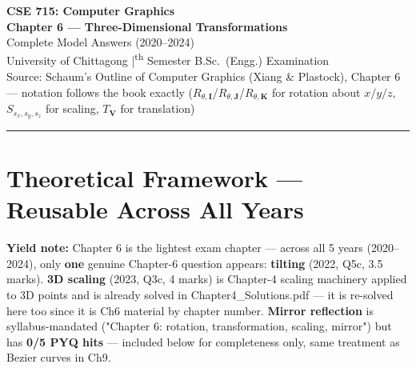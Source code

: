 \documentclass[12pt, a4paper]{article}
\newenvironment{notesbox}{\begin{mdframed}[style=notesframe]}{\end{mdframed}}
\begin{document}

\begin{center}
  {\LARGE\bfseries\color{sectionblue} CSE 715: Computer Graphics}\\[0.6em]
  {\Large\bfseries Chapter 6 --- Three-Dimensional Transformations}\\[0.3em]
  {\large Complete Model Answers (2020--2024)}\\[0.2em]
  {\normalsize University of Chittagong \quad|\textsuperscript{th} Semester B.Sc.\ (Engg.) Examination}\\[0.3em]
  {\small Source: Schaum's Outline of Computer Graphics (Xiang \& Plastock), Chapter 6 --- notation follows the book exactly ($R_{\theta,\mathbf{I}}$/$R_{\theta,\mathbf{J}}$/$R_{\theta,\mathbf{K}}$ for rotation about $x/y/z$, $S_{s_x,s_y,s_z}$ for scaling, $T_{\mathbf{V}}$ for translation)}
\end{center}

\vspace{0.3em}
\noindent\rule{\linewidth}{1pt}
\vspace{0.5em}

\tableofcontents
\newpage

\section{Theoretical Framework --- Reusable Across All Years}
\begin{notesbox}
\textbf{Yield note:} Chapter 6 is the lightest exam chapter --- across all 5 years (2020--2024), only \textbf{one} genuine Chapter-6 question appears: \textbf{tilting} (2022, Q5c, 3.5 marks). \textbf{3D scaling} (2023, Q3c, 4 marks) is Chapter-4 scaling machinery applied to 3D points and is already solved in Chapter4\_Solutions.pdf --- it is re-solved here too since it is Ch6 material by chapter number. \textbf{Mirror reflection} is syllabus-mandated ("Chapter 6: rotation, transformation, scaling, mirror") but has \textbf{0/5 PYQ hits} --- included below for completeness only, same treatment as Bezier curves in Ch9.
\end{notesbox}

\end{document}
